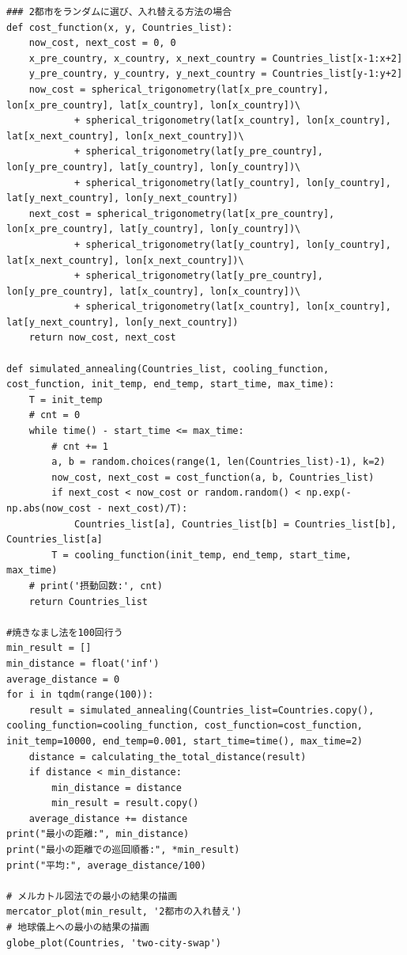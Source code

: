 \documentclass[a4paper,11pt]{ltjsarticle}
\begin{document}
\begin{lstlisting}
### 2都市をランダムに選び、入れ替える方法の場合
def cost_function(x, y, Countries_list):
    now_cost, next_cost = 0, 0
    x_pre_country, x_country, x_next_country = Countries_list[x-1:x+2]
    y_pre_country, y_country, y_next_country = Countries_list[y-1:y+2]
    now_cost = spherical_trigonometry(lat[x_pre_country], lon[x_pre_country], lat[x_country], lon[x_country])\
            + spherical_trigonometry(lat[x_country], lon[x_country], lat[x_next_country], lon[x_next_country])\
            + spherical_trigonometry(lat[y_pre_country], lon[y_pre_country], lat[y_country], lon[y_country])\
            + spherical_trigonometry(lat[y_country], lon[y_country], lat[y_next_country], lon[y_next_country])
    next_cost = spherical_trigonometry(lat[x_pre_country], lon[x_pre_country], lat[y_country], lon[y_country])\
            + spherical_trigonometry(lat[y_country], lon[y_country], lat[x_next_country], lon[x_next_country])\
            + spherical_trigonometry(lat[y_pre_country], lon[y_pre_country], lat[x_country], lon[x_country])\
            + spherical_trigonometry(lat[x_country], lon[x_country], lat[y_next_country], lon[y_next_country])
    return now_cost, next_cost

def simulated_annealing(Countries_list, cooling_function, cost_function, init_temp, end_temp, start_time, max_time):
    T = init_temp
    # cnt = 0
    while time() - start_time <= max_time:
        # cnt += 1
        a, b = random.choices(range(1, len(Countries_list)-1), k=2)
        now_cost, next_cost = cost_function(a, b, Countries_list)
        if next_cost < now_cost or random.random() < np.exp(-np.abs(now_cost - next_cost)/T):
            Countries_list[a], Countries_list[b] = Countries_list[b], Countries_list[a]
        T = cooling_function(init_temp, end_temp, start_time, max_time)
    # print('摂動回数:', cnt)
    return Countries_list

#焼きなまし法を100回行う
min_result = []
min_distance = float('inf')
average_distance = 0
for i in tqdm(range(100)):
    result = simulated_annealing(Countries_list=Countries.copy(), cooling_function=cooling_function, cost_function=cost_function, init_temp=10000, end_temp=0.001, start_time=time(), max_time=2)
    distance = calculating_the_total_distance(result)
    if distance < min_distance:
        min_distance = distance
        min_result = result.copy()
    average_distance += distance
print("最小の距離:", min_distance)
print("最小の距離での巡回順番:", *min_result)
print("平均:", average_distance/100)

# メルカトル図法での最小の結果の描画
mercator_plot(min_result, '2都市の入れ替え')
# 地球儀上への最小の結果の描画
globe_plot(Countries, 'two-city-swap')


\end{lstlisting}
\end{document}
